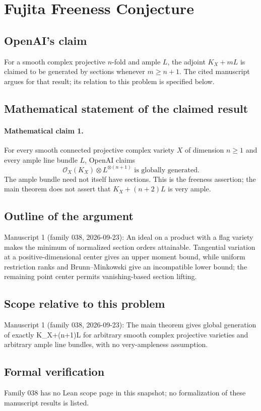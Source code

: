 \documentclass[11pt]{article}
\begin{document}
\section*{Fujita Freeness Conjecture}

\subsection{OpenAI's claim}
For a smooth complex projective $n$-fold and ample $L$, the adjoint $K_X+mL$ is claimed to be generated by sections whenever $m\ge n+1$. The cited manuscript argues for that result; its relation to this problem is specified below.

\subsection{Mathematical statement of the claimed result}
\paragraph{Mathematical claim 1.} For every smooth connected projective complex variety $X$ of dimension $n\ge1$ and every ample line bundle $L$, OpenAI claims
\[
\mathcal O_X(K_X)\otimes L^{\otimes(n+1)}\text{ is globally generated}.
\]
The ample bundle need not itself have sections. This is the freeness assertion; the main theorem does not assert that $K_X+(n+2)L$ is very ample.

\subsection{Outline of the argument}
Manuscript 1 (family 038, 2026-09-23): An ideal on a product with a flag variety makes the minimum of normalized section orders attainable. Tangential variation at a positive-dimensional center gives an upper moment bound, while uniform restriction ranks and Brunn--Minkowski give an incompatible lower bound; the remaining point center permits vanishing-based section lifting.

\subsection{Scope relative to this problem}
Manuscript 1 (family 038, 2026-09-23): The main theorem gives global generation of exactly K\_X+(n+1)L for arbitrary smooth complex projective varieties and arbitrary ample line bundles, with no very-ampleness assumption.

\subsection{Formal verification}
Family 038 has no Lean scope page in this snapshot; no formalization of these manuscript results is listed.
\end{document}
